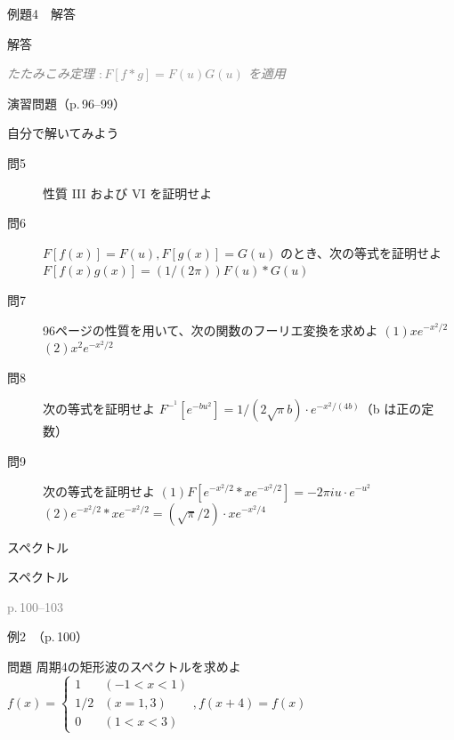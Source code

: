 \documentclass[aspectratio=43,professionalfonts,handout]{beamer}
\begin{document}
\begin{frame}{例題4　解答}
  \begin{exampleblock}{解答}
  \end{exampleblock}
  {\footnotesize \textcolor{gray}{\textit{たたみこみ定理 $: F[f*g] = F(u)G(u)$ を適用}}}
\end{frame}

\begin{frame}{演習問題（p.\,96--99）}
  \begin{exampleblock}{自分で解いてみよう}
  \begin{description}
    \item[問5] 性質 III および VI を証明せよ
    \item[問6] $F[f(x)] = F(u), F[g(x)] = G(u)$ のとき、次の等式を証明せよ
    $F[f(x)g(x)] = (1/(2\pi)) F(u) * G(u)$\\
    \item[問7] 96ページの性質を用いて、次の関数のフーリエ変換を求めよ
    $(1) xe^{-x^{2}/2}$\\
    $(2) x^{2}e^{-x^{2}/2}$\\
    \item[問8] 次の等式を証明せよ
    $F^{-}^{1}[e^{-bu^{2}}] = 1/(2\sqrt\pi b) \cdot e^{-x^{2}/(4b)}$（b は正の定数）\\
    \item[問9] 次の等式を証明せよ
    $(1) F[e^{-x^{2}/2} * xe^{-x^{2}/2}] = -2\pi iu\cdot e^{-u^{2}}$\\
    $(2) e^{-x^{2}/2} * xe^{-x^{2}/2} = (\sqrt\pi/2)\cdot xe^{-x^{2}/4}$\\
  \end{description}
  \end{exampleblock}
\end{frame}

\begin{frame}{スペクトル}
  \begin{block}{}
  {\large スペクトル}
  \end{block}
  \vfill\hfill{\scriptsize \textcolor{gray}{p.\,100--103}}
\end{frame}

\begin{frame}{例2　（p.\,100）}
  \begin{exampleblock}{問題}
    周期4の矩形波のスペクトルを求めよ\\[2pt]
    $f(x) = \begin{cases} 1 & (-1 < x < 1) \\ 1/2 & (x = 1, 3) \\ 0 & (1 < x < 3) \end{cases},  f(x+4) = f(x)$\\[2pt]
  \end{exampleblock}
\end{frame}
\end{document}

